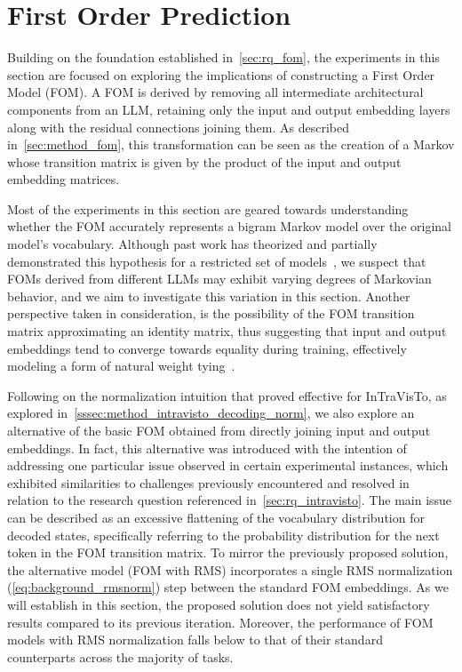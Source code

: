 \section{First Order Prediction}\label{sec:exp_fom}

Building on the foundation established in~\cref{sec:rq_fom}, the experiments in this section are focused on exploring the implications of constructing a First Order Model (FOM).
A FOM is derived by removing all intermediate architectural components from an LLM, retaining only the input and output embedding layers along with the residual connections joining them.
As described in~\cref{sec:method_fom}, this transformation can be seen as the creation of a Markov whose transition matrix is given by the product of the input and output embedding matrices.

Most of the experiments in this section are geared towards understanding whether the FOM accurately represents a bigram Markov model over the original model's vocabulary.
Although past work has theorized and partially demonstrated this hypothesis for a restricted set of models~\cite{elhage2021}, we suspect that FOMs derived from different LLMs may exhibit varying degrees of Markovian behavior, and we aim to investigate this variation in this section.
Another perspective taken in consideration, is the possibility of the FOM transition matrix approximating an identity matrix, thus suggesting that input and output embeddings tend to converge towards equality during training, effectively modeling a form of natural weight tying~\cite{inan2017,press2017}.

Following on the normalization intuition that proved effective for InTraVisTo, as explored in~\cref{sssec:method_intravisto_decoding_norm}, we also explore an alternative of the basic FOM obtained from directly joining input and output embeddings.
In fact, this alternative was introduced with the intention of addressing one particular issue observed in certain experimental instances, which exhibited similarities to challenges previously encountered and resolved in relation to the research question referenced in~\cref{sec:rq_intravisto}.
The main issue can be described as an excessive flattening of the vocabulary distribution for decoded states, specifically referring to the probability distribution for the next token in the FOM transition matrix.
To mirror the previously proposed solution, the alternative model (FOM with RMS) incorporates a single RMS normalization (\cref{eq:background_rmsnorm}) step between the standard FOM embeddings.
As we will establish in this section, the proposed solution does not yield satisfactory results compared to its previous iteration.
Moreover, the performance of FOM models with RMS normalization falls below to that of their standard counterparts across the majority of tasks.

